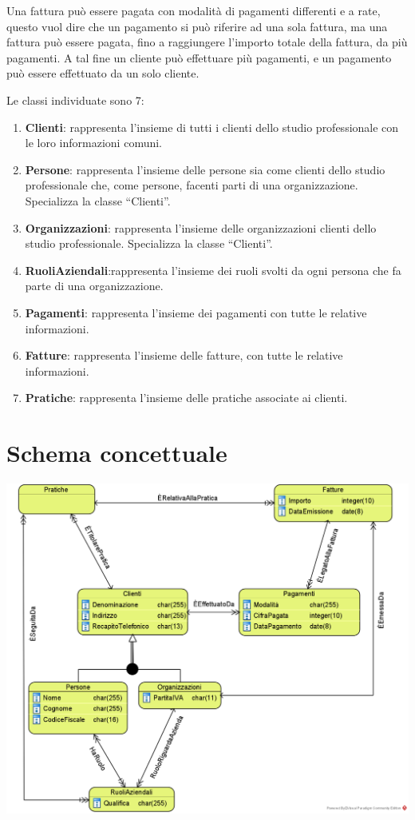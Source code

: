 \documentclass[a4paper,12pt]{article}
\begin{document}
Una fattura può essere pagata con modalità di pagamenti differenti e a rate, questo vuol dire che un pagamento si può riferire ad una sola  fattura, ma una fattura può essere pagata, fino a raggiungere l’importo totale della fattura, da più pagamenti. A tal fine un cliente può effettuare più pagamenti, e un pagamento può essere effettuato da un solo cliente.

Le classi individuate sono  7:
\begin{enumerate}
\item \textbf{Clienti}: rappresenta l’insieme di tutti i clienti dello studio professionale con le loro informazioni comuni.
\item \textbf{Persone}: rappresenta l’insieme delle persone sia come clienti dello studio professionale che, come persone, facenti parti di  una organizzazione. Specializza la classe “Clienti”.
\item \textbf{Organizzazioni}: rappresenta l’insieme delle organizzazioni clienti dello studio professionale. Specializza la classe “Clienti”.
\item \textbf{RuoliAziendali}:rappresenta l’insieme dei ruoli svolti da ogni persona che fa parte di una organizzazione.
\item \textbf{Pagamenti}: rappresenta l’insieme dei pagamenti con tutte le relative informazioni.
\item \textbf{Fatture}: rappresenta l’insieme delle fatture, con tutte le relative informazioni.
\item \textbf{Pratiche}: rappresenta l’insieme delle pratiche associate ai clienti.
\end{enumerate}

 \section{ Schema concettuale }

\begin{minipage}{\textwidth}
\begin{center}
\centering 
\centerline{
\includegraphics[width=\textwidth]{ Schema concettuale a oggetti.png }
}
\end{center}
\end{minipage}
\end{document}
